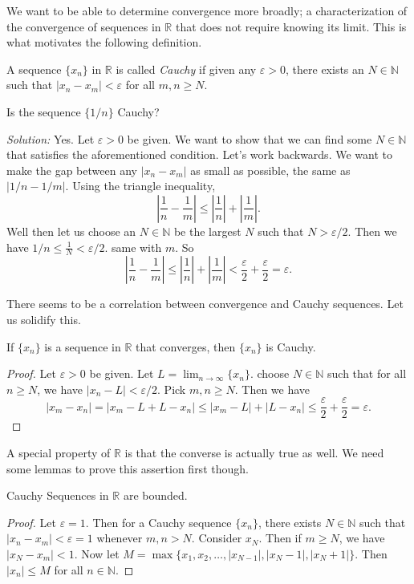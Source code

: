 \documentclass[11pt]{article}
\theoremstyle{definition}
\newcommand{\R}{\mathbb{R}}                      %
\newcommand{\N}{\mathbb{N}}
\begin{document}
We want to be able to determine convergence more broadly; a characterization of the convergence of sequences in $\R$ that does not require knowing its limit. This is what motivates the following definition.

 A sequence $\{x_n\}$ in $\R$ is called \textit{Cauchy} if given any $\varepsilon>0$, there exists an $N\in\N$ such that $|x_n-x_m|<\varepsilon$ for all $m,n\geq N$.

\ex Is the sequence $\{1/n\}$ Cauchy?

\textit{Solution:} Yes. Let $\varepsilon>0$ be given. We want to show that we can find some $N\in \N$ that satisfies the aforementioned condition. Let's work backwards. We want to make the gap between any $|x_n-x_m|$ as small as possible, the same as $|1/n-1/m|$. Using the triangle inequality,
$$
\left|\frac{1}{n}-\frac{1}{m} \right|\leq \left|\frac{1}{n}\right| +\left| \frac{1}{m}\right|.
$$
Well then let us choose an $N\in\N$ be the largest $N$ such that $N>\varepsilon/2$. Then we have $1/n\leq \frac{1}{N}<\varepsilon/2$. same with $m$. So
$$
\left|\frac{1}{n}-\frac{1}{m} \right|\leq \left|\frac{1}{n}\right| +\left| \frac{1}{m}\right|<\frac{\varepsilon}{2}+\frac{\varepsilon}{2}=\varepsilon.
$$

There seems to be a correlation between convergence and Cauchy sequences. Let us solidify this.

\prop If $\{x_n\}$ is a sequence in $\R$ that converges, then $\{x_n\}$ is Cauchy.

\begin{proof}
    Let $\varepsilon>0$ be given. Let $L=\lim_{n\to\infty} \{x_n\}$. choose $N\in \N$ such that for all $n\geq N$, we have $|x_n-L|<\varepsilon/2$. Pick $m,n\geq N$. Then we have
    $$
    |x_m-x_n|=|x_m-L+L-x_n|\leq |x_m-L|+|L-x_n|\leq  \frac{\varepsilon}{2}+\frac{\varepsilon}{2}=\varepsilon.
    $$
\end{proof}

A special property of $\R$ is that the converse is actually true as well. We need some lemmas to prove this assertion first though.

\lem Cauchy Sequences in $\R$ are bounded.
\begin{proof}
    Let $\varepsilon=1$. Then for a Cauchy sequence $\{x_n\}$, there exists $N\in\N$ such that $|x_n-x_m|<\varepsilon=1$ whenever $m,n>N$. Consider $x_N$. Then if $m\geq N$, we have $|x_N-x_m|<1$. Now let $M=\max \{x_1,x_2,\dots,|x_{N-1}|,|x_N -1|,|x_N +1|\}$. Then $|x_n|\leq M$ for all $n\in\N$.
\end{proof}
\end{document}
